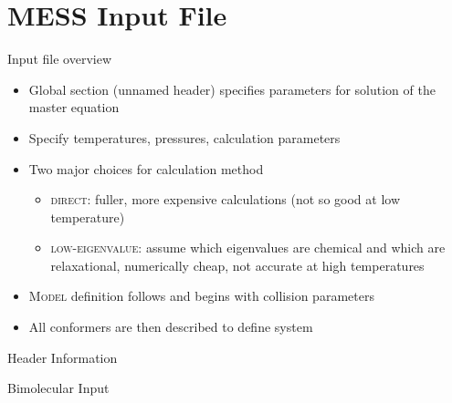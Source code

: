 \documentclass[10pt,presentation]{beamer}
\begin{document}
\section{MESS Input File}
% 
% 
%
% 
% 


\begin{frame}{Input file overview}
  \begin{itemize}
   \item Global section (unnamed header) specifies parameters for solution of the master equation
   \item Specify temperatures, pressures, calculation parameters
   \item Two major choices for calculation method
    \begin{itemize}
     \item \textsc{direct}: fuller, more expensive calculations (not so good at low temperature)
     \item \textsc{low-eigenvalue}: assume which eigenvalues are chemical and which are relaxational, numerically cheap, not accurate at high temperatures
    \end{itemize}
   \item \textsc{Model} definition follows and begins with collision parameters
   \item All conformers are then described to define system
  \end{itemize}
\end{frame}

\begin{frame}[fragile]{Header Information}
  \tiny{
  
  }
\end{frame}

\begin{frame}[fragile]{Bimolecular Input}
  \vspace{-0.8cm}
  \tiny{
  
  }
\end{frame}
\end{document}
